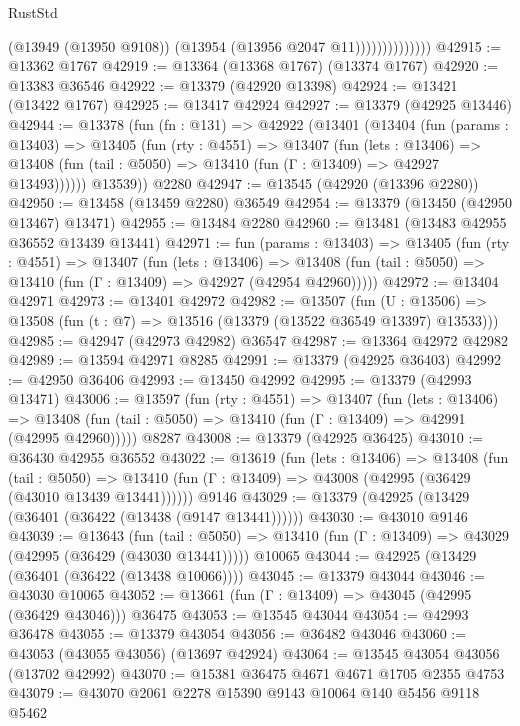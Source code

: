 \begin{lexlean}{RustStd}
\begin{coremodule}
                            (@13949 (@13950 @9108))
                            (@13954 (@13956 @2047 @11))))))))))))))
@42915 := @13362 @1767
@42919 := @13364 (@13368 @1767) (@13374 @1767)
@42920 := @13383 @36546
@42922 := @13379 (@42920 @13398)
@42924 := @13421 (@13422 @1767)
@42925 := @13417 @42924
@42927 := @13379 (@42925 @13446)
@42944 := @13378
    (fun (fn : @131) =>
    @42922
      (@13401
        (@13404
          (fun (params : @13403) =>
          @13405
            (fun (rty : @4551) =>
            @13407
              (fun (lets : @13406) =>
              @13408 (fun (tail : @5050) => @13410 (fun (Γ : @13409) => @42927 @13493))))))
        @13539))
    @2280
@42947 := @13545 (@42920 (@13396 @2280))
@42950 := @13458 (@13459 @2280) @36549
@42954 := @13379 (@13450 (@42950 @13467) @13471)
@42955 := @13484 @2280
@42960 := @13481 (@13483 @42955 @36552 @13439 @13441)
@42971 := fun (params : @13403) =>
  @13405
    (fun (rty : @4551) =>
    @13407
      (fun (lets : @13406) =>
      @13408 (fun (tail : @5050) => @13410 (fun (Γ : @13409) => @42927 (@42954 @42960)))))
@42972 := @13404 @42971
@42973 := @13401 @42972
@42982 := @13507
    (fun (U : @13506) => @13508 (fun (t : @7) => @13516 (@13379 (@13522 @36549 @13397) @13533)))
@42985 := @42947 (@42973 @42982) @36547
@42987 := @13364 @42972 @42982
@42989 := @13594 @42971 @8285
@42991 := @13379 (@42925 @36403)
@42992 := @42950 @36406
@42993 := @13450 @42992
@42995 := @13379 (@42993 @13471)
@43006 := @13597
    (fun (rty : @4551) =>
    @13407
      (fun (lets : @13406) =>
      @13408 (fun (tail : @5050) => @13410 (fun (Γ : @13409) => @42991 (@42995 @42960)))))
    @8287
@43008 := @13379 (@42925 @36425)
@43010 := @36430 @42955 @36552
@43022 := @13619
    (fun (lets : @13406) =>
    @13408
      (fun (tail : @5050) =>
      @13410 (fun (Γ : @13409) => @43008 (@42995 (@36429 (@43010 @13439 @13441))))))
    @9146
@43029 := @13379 (@42925 (@13429 (@36401 (@36422 (@13438 (@9147 @13441))))))
@43030 := @43010 @9146
@43039 := @13643
    (fun (tail : @5050) => @13410 (fun (Γ : @13409) => @43029 (@42995 (@36429 (@43030 @13441)))))
    @10065
@43044 := @42925 (@13429 (@36401 (@36422 (@13438 @10066))))
@43045 := @13379 @43044
@43046 := @43030 @10065
@43052 := @13661 (fun (Γ : @13409) => @43045 (@42995 (@36429 @43046))) @36475
@43053 := @13545 @43044
@43054 := @42993 @36478
@43055 := @13379 @43054
@43056 := @36482 @43046
@43060 := @43053 (@43055 @43056) (@13697 @42924)
@43064 := @13545 @43054 @43056 (@13702 @42992)
@43070 := @15381 @36475 @4671 @4671 @1705 @2355 @4753
@43079 := @43070 @2061 @2278 @15390 @9143 @10064 @140 @5456 @9118 @5462

\end{coremodule}
\end{lexlean}
